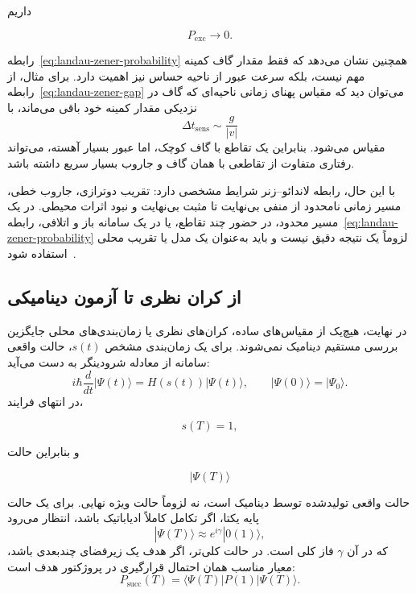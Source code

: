 داریم

$$
P_{\mathrm{exc}}\rightarrow0.
$$

رابطه~\eqref{eq:landau-zener-probability} همچنین نشان می‌دهد که
فقط مقدار گاف کمینه مهم نیست، بلکه سرعت عبور از ناحیه حساس نیز
اهمیت دارد. برای مثال، از رابطه~\eqref{eq:landau-zener-gap} می‌توان
دید که مقیاس پهنای زمانی ناحیه‌ای که گاف در نزدیکی مقدار کمینه خود
باقی می‌ماند، با
\begin{equation}
	\Delta t_{\mathrm{sens}}
	\sim
	\frac{g}{|v|}
\end{equation}
مقیاس می‌شود. بنابراین یک تقاطع با گاف کوچک، اما عبور بسیار آهسته،
می‌تواند رفتاری متفاوت از تقاطعی با همان گاف و جاروب بسیار سریع
داشته باشد.

با این حال، رابطه لاندائو--زنر شرایط مشخصی دارد: تقریب دو‌ترازی،
جاروب خطی، مسیر زمانی نامحدود از منفی بی‌نهایت تا مثبت بی‌نهایت و
نبود اثرات محیطی. در یک مسیر محدود، در حضور چند تقاطع، یا در یک
سامانه باز و اتلافی، رابطه~\eqref{eq:landau-zener-probability}
لزوماً یک نتیجه دقیق نیست و باید به‌عنوان یک مدل یا تقریب محلی
استفاده شود~\cite{AlbashLidar2018}.

\subsection{از کران نظری تا آزمون دینامیکی}

در نهایت، هیچ‌یک از مقیاس‌های ساده، کران‌های نظری یا زمان‌بندی‌های
محلی جایگزین بررسی مستقیم دینامیک نمی‌شوند. برای یک زمان‌بندی
مشخص $s(t)$، حالت واقعی سامانه از معادله شرودینگر به دست می‌آید:
\begin{equation}
	i\hbar\frac{d}{dt}|\Psi(t)\rangle=
	H(s(t))|\Psi(t)\rangle,
	\qquad
	|\Psi(0)\rangle=|\Psi_0\rangle.
	\label{eq:time-dependent-schrodinger}
\end{equation}
در انتهای فرایند،

$$
s(T)=1,
$$

و بنابراین حالت

$$
|\Psi(T)\rangle
$$

حالت واقعی تولیدشده توسط دینامیک است، نه لزوماً حالت ویژه نهایی.
برای یک حالت پایه یکتا، اگر تکامل کاملاً ادیاباتیک باشد، انتظار
می‌رود
\begin{equation}
	|\Psi(T)\rangle
	\approx
	e^{i\gamma}
	|0(1)\rangle,
\end{equation}
که در آن $\gamma$ فاز کلی است. در حالت کلی‌تر، اگر هدف یک زیر‌فضای
چندبعدی باشد، معیار مناسب همان احتمال قرارگیری در پروژکتور هدف است:
\begin{equation}
	P_{\mathrm{succ}}(T)=	
	\langle\Psi(T)|P(1)|\Psi(T)\rangle.
\end{equation}

